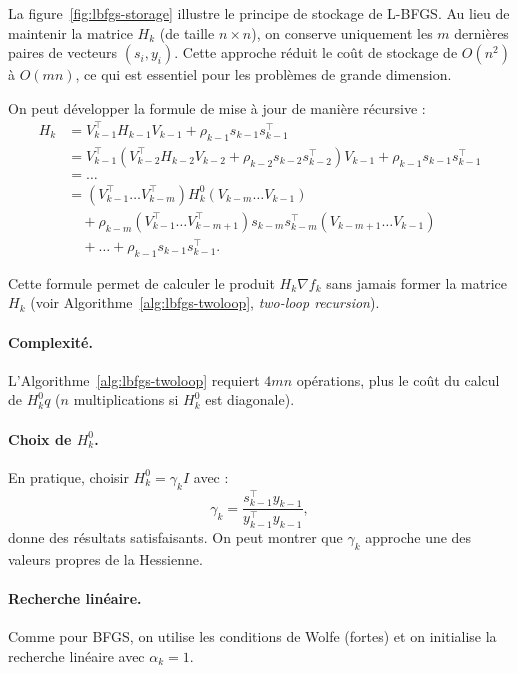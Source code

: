 \begin{figureexplanation}
La figure~\ref{fig:lbfgs-storage} illustre le principe de stockage de L-BFGS. Au lieu de maintenir la matrice $H_k$ (de taille $n \times n$), on conserve uniquement les $m$ dernières paires de vecteurs $(s_i, y_i)$. Cette approche réduit le coût de stockage de $O(n^2)$ à $O(mn)$, ce qui est essentiel pour les problèmes de grande dimension.
\end{figureexplanation}

On peut développer la formule de mise à jour de manière récursive :
\begin{align*}
    H_k &= V_{k-1}^\top H_{k-1} V_{k-1} + \rho_{k-1} s_{k-1} s_{k-1}^\top \\
    &= V_{k-1}^\top (V_{k-2}^\top H_{k-2} V_{k-2} + \rho_{k-2} s_{k-2} s_{k-2}^\top) V_{k-1} + \rho_{k-1} s_{k-1} s_{k-1}^\top \\
    &= \dots \\
    &= (V_{k-1}^\top \dots V_{k-m}^\top) H_k^0 (V_{k-m} \dots V_{k-1}) \\
    &\quad + \rho_{k-m} (V_{k-1}^\top \dots V_{k-m+1}^\top) s_{k-m} s_{k-m}^\top (V_{k-m+1} \dots V_{k-1}) \\
    &\quad + \dots + \rho_{k-1} s_{k-1} s_{k-1}^\top.
\end{align*}

Cette formule permet de calculer le produit $H_k \nabla f_k$ sans jamais former la matrice $H_k$ (voir Algorithme~\ref{alg:lbfgs-twoloop}, \textit{two-loop recursion}).

\paragraph{Complexité.}
L'Algorithme~\ref{alg:lbfgs-twoloop} requiert $4mn$ opérations, plus le coût du calcul de $H_k^0 q$ ($n$ multiplications si $H_k^0$ est diagonale).

\paragraph{Choix de $H_k^0$.}
En pratique, choisir $H_k^0 = \gamma_k I$ avec :
\begin{equation}
    \gamma_k = \frac{s_{k-1}^\top y_{k-1}}{y_{k-1}^\top y_{k-1}},
\end{equation}
donne des résultats satisfaisants. On peut montrer que $\gamma_k$ approche une des valeurs propres de la Hessienne.

\paragraph{Recherche linéaire.}
Comme pour BFGS, on utilise les conditions de Wolfe (fortes) et on initialise la recherche linéaire avec $\alpha_k = 1$.

